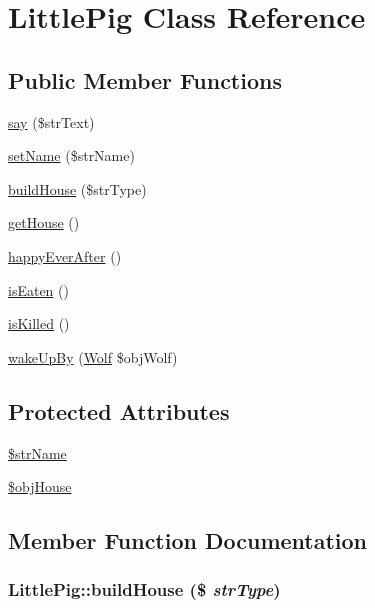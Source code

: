 \hypertarget{class_little_pig}{
\section{LittlePig Class Reference}
\label{class_little_pig}
}
\subsection*{Public Member Functions}
\begin{CompactItemize}
\item 
\hyperlink{class_little_pig_e1b8d158165b0d2af05ab13942954c03}{say} (\$strText)
\item 
\hyperlink{class_little_pig_6ef9513d6d9d02d9ed83bb18db30b150}{setName} (\$strName)
\item 
\hyperlink{class_little_pig_f6d75b4f92155edb65be341352055332}{buildHouse} (\$strType)
\item 
\hyperlink{class_little_pig_8c1c64b5dbf72b856e86326372437d14}{getHouse} ()
\item 
\hyperlink{class_little_pig_e312dbd0c7c7b3d61158f18242110619}{happyEverAfter} ()
\item 
\hyperlink{class_little_pig_3c9b9848ad3cd1753ad2295a6bdbb4c4}{isEaten} ()
\item 
\hyperlink{class_little_pig_8c4d46e7f9edeec28cca1e60d7dcd6e6}{isKilled} ()
\item 
\hyperlink{class_little_pig_32b61646743334117a7f9fac62a9099c}{wakeUpBy} (\hyperlink{class_wolf}{Wolf} \$objWolf)
\end{CompactItemize}
\subsection*{Protected Attributes}
\begin{CompactItemize}
\item 
\hyperlink{class_little_pig_c52ffef44781a732c80f1e57904ab164}{\$strName}
\item 
\hyperlink{class_little_pig_a04c1809050a47bf870e73c05276b3e2}{\$objHouse}
\end{CompactItemize}


\subsection{Member Function Documentation}
\hypertarget{class_little_pig_f6d75b4f92155edb65be341352055332}{
\subsubsection[{buildHouse}]{\setlength{\rightskip}{0pt plus 5cm}LittlePig::buildHouse (\$ {\em strType})}}
\label{class_little_pig_f6d75b4f92155edb65be341352055332}


